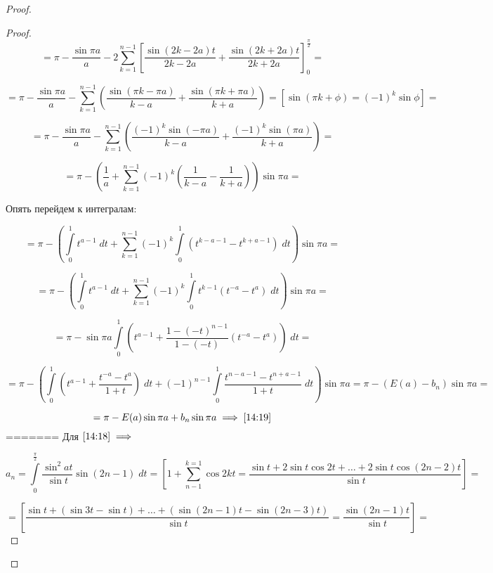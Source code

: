 \documentclass[../../main.tex]{subfiles}
\begin{document}
\begin{proof}
\begin{proof}
				\[  = \pi - \frac{\sin{\pi a}}{a} - 2 \sum_{k=1}^{n-1} \left[ \frac{\sin{(2k-2a)t}}{2k-2a} + \frac{\sin{(2k+2a)t}}{2k+2a} \right]_{0}^{\frac{\pi}{2}} =       \]
				
				\[    = \pi - \frac{\sin{\pi a}}{a} -  \sum_{k=1}^{n-1} \left( \frac{\sin{(\pi k- \pi a)}}{k-a} + \frac{\sin{(\pi k+ \pi a)}}{k+a} \right) = \left[ \sin{(\pi k + \phi) = \left( -1\right)^k \sin{\phi}} \right] =           \]
				
				\[  =   \pi - \frac{\sin{\pi a}}{a} - \sum_{k=1}^{n-1} \left( \frac{(-1)^k \sin{(- \pi a)}}{k-a} + \frac{(-1)^k \sin{(\pi a)}}{k+a} \right)  =          \]
				
				\[ = \pi -\left(  \frac{1}{a} + \sum_{k=1}^{n-1} (-1)^k \left( \frac{1}{k-a} - \frac{1}{k+a} \right)    \right) \sin{\pi a} =        \]
				
				Опять перейдем к интегралам:
				
				\[ = \pi - \left( \int\limits_{0}^{1} t^{a-1} \; dt + \sum_{k=1}^{n-1} (-1)^k \int\limits_{0}^{1} \left( t^{k-a-1} - t^{k+a - 1} \right) \; dt \right)  \sin{\pi a}  =           \]
				
				\[  =  \pi - \left( \int\limits_{0}^{1} t^{a-1} \; dt + \sum_{k=1}^{n-1} (-1)^k \int\limits_{0}^{1} t^{k-1} \left( t^{-a} - t^{a} \right) \; dt \right)  \sin{\pi a} =      \]
				
				\[  = \pi - \sin{\pi a} \int\limits_{0}^{1} \left( t^{a-1} + \frac{1-(-t)^{n-1}}{1-(-t)}\left( t^{-a} - t^{a} \right) \right) \; dt  =      \]
				
				\[ = \pi - \left( \int\limits_{0}^{1} \left( t^{a-1} + \frac{t^{-a} - t^a}{1+t} \right) \; dt + (-1)^{n-1} \int\limits_{0}^{1} \frac{t^{n-a-1} - t^{n+a-1}}{1+t} \; dt   \right) \sin{\pi a}  = \pi - \left( E(a) - b_n \right) \sin{\pi a} =    \]
				
				\[ = \pi - E(a) \sin{\pi a} + b_n \sin{\pi a} \implies \eqref{14:19}      \]
=======
				Для $\eqref{14:18} \implies $
				
				\[   a_n =  \int\limits_{0}^{\frac{\pi}{2}} \frac{\sin^2{at}}{\sin{t}} 
				\sin{\left(2n-1 \right) } \; dt = \left[ 1 + \sum_{n-1}^{k = 1} \cos{2k t} 
				= \frac{\sin{t} + 2 \sin{t} \cos{2t} + \dots + 2\sin{t} \cos{(2n - 
				2)t}}{\sin{t}} \right]   =   \]
				
				\[  = \left[ \frac{\sin{t} + \left( \sin{3t} - \sin{t} \right) + \dots 
				+\left( \sin{(2n-1)t} - \sin{(2n-3)t} \right) }{\sin{t}} = 
				\frac{\sin{(2n-1)t}}{\sin{t}} \right] =      \]
				

\end{proof}
\end{proof}
\end{document}
